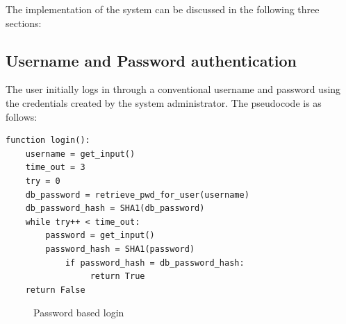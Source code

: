 \documentclass[12pt]{report}			%
\begin{document}
\noindent The implementation of the system can be discussed in the following three sections:

\subsection{ Username and Password authentication }

The user initially logs in through a conventional username and password using the credentials created by the system administrator. The pseudocode is as follows:

\begin{verbatim}
function login():
    username = get_input()
    time_out = 3
    try = 0
    db_password = retrieve_pwd_for_user(username)
    db_password_hash = SHA1(db_password)
    while try++ < time_out:
        password = get_input()
        password_hash = SHA1(password)
            if password_hash = db_password_hash:
                 return True
    return False
\end{verbatim}


\begin{figure}
	\centering
	\quad
	\caption{Password based login}
\end{figure}
\end{document}
